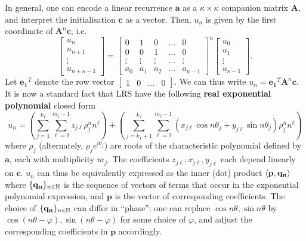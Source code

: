 In general, one can encode a linear recurrence $\mathbf{a}$ as a $\kappa \times \kappa$ companion matrix $\mathbf{A}$, and interpret the initialisation $\mathbf{c}$ as a vector. Then, $u_n$ is given by the first coordinate of $\mathbf{A}^n\mathbf{c}$, i.e.
\begin{equation}
\label{eq:companion}
\begin{bmatrix}
u_n \\
u_{n+1} \\
\vdots \\
u_{n+\kappa-1}
\end{bmatrix} 
= 
\begin{bmatrix}
0 & 1 & 0 & \dots & 0 \\
0 & 0 & 1 & \dots & 0 \\
\vdots & \vdots & \vdots & \dots & \vdots \\
a_0 & a_1 & a_2 & \dots & a_{\kappa-1}
\end{bmatrix}^n
\begin{bmatrix}
u_0 \\
u_{1} \\
\vdots \\
u_{\kappa-1}
\end{bmatrix}.
\end{equation}
Let $\mathbf{e_1}^T$ denote the row vector $\begin{bmatrix}1 & 0 & \dots & 0\end{bmatrix}$. We can thus write $u_n = \mathbf{e_1}^T\mathbf{A}^n\mathbf{c}$. It is now a standard fact that LRS have the following \textbf{real exponential polynomial} closed form 
\begin{equation}
\label{eq:realexppoly}
u_n = \left(\sum_{j=1}^{k_1}\sum_{\ell = 0}^{m_j-1} z_{j\ell}\rho_j^n n^\ell\right) + \left(\sum_{j=k_1 + 1}^{k_2} \sum_{\ell = 0}^{m_j-1} (x_{j\ell} \cos n\theta_j + y_{j\ell}\sin n\theta_j)\rho_j^n n^\ell\right)
\end{equation}
where $\rho_j$ (alternately, $\rho_j e^{i\theta_j}$) are roots of the characteristic polynomial defined by $\mathbf{a}$, each with multiplicity $m_j$. The coefficients $z_{j\ell}, x_{j\ell}, y_{j\ell}$ each depend linearly on $\mathbf{c}$. $u_n$ can thus be equivalently expressed as the inner (dot) product $\langle\mathbf{p}, \mathbf{q_n}\rangle$ where $\{\mathbf{q_n}\}_{n\in \mathbb{N}}$ is the sequence of vectors of terms that occur in the exponential polynomial expression, and $\mathbf{p}$ is the vector of corresponding coefficients. The choice of $\{\mathbf{q_n}\}_{n\in \mathbb{N}}$ can differ in ``phase'': one can replace $\cos n\theta, \sin n\theta$ by $\cos (n\theta-\varphi), \sin(n\theta-\varphi)$ for some choice of $\varphi$, and adjust the corresponding coefficients in $\mathbf{p}$ accordingly.

